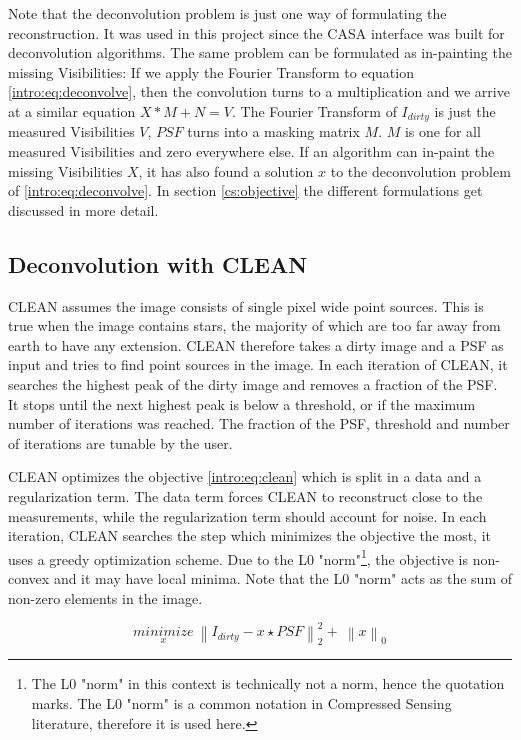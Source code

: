Note that the deconvolution problem is just one way of formulating the reconstruction. It was used in this project since the CASA interface was built for deconvolution algorithms. The same problem can be formulated as in-painting the missing Visibilities: If we apply the Fourier Transform to equation \eqref{intro:eq:deconvolve}, then the convolution turns to a multiplication and we arrive at a similar equation $X*M + N = V$. The Fourier Transform of $I_{dirty}$ is just the measured Visibilities $V$,  $PSF$ turns into a masking matrix $M$. $M$ is one for all measured Visibilities and zero everywhere else. If an algorithm can in-paint the missing Visibilities $X$, it has also found a solution $x$ to the deconvolution problem of \eqref{intro:eq:deconvolve}. In section \ref{cs:objective} the different formulations get discussed in more detail.


\subsection{Deconvolution with CLEAN}
CLEAN assumes the image consists of single pixel wide point sources. This is true when the image contains stars, the majority of which are too far away from earth to have any extension. CLEAN therefore takes a dirty image and a PSF as input and tries to find point sources in the image. In each iteration of CLEAN, it searches the highest peak of the dirty image and removes a fraction of the PSF. It stops until the next highest peak is below a threshold, or if the maximum number of iterations was reached. The fraction of the PSF, threshold and number of iterations are tunable by the user. 

CLEAN optimizes the objective \eqref{intro:eq:clean} which is split in a data and a regularization term. The data term forces CLEAN to reconstruct close to the measurements, while the regularization term should account for noise. In each iteration, CLEAN searches the step which minimizes the objective the most, it uses a greedy optimization scheme. Due to the L0 "norm"\footnote{The L0 "norm" in this context is technically not a norm, hence the quotation marks. The L0 "norm" is a common notation in Compressed Sensing literature, therefore it is used here.}, the objective is non-convex and it may have local minima. Note that the L0 "norm" acts as the sum of non-zero elements in the image.

\begin{equation}\label{intro:eq:clean}
\underset{x}{minimize} \: \left \| I_{dirty} - x \star PSF \right \|_2^2 + \: \left \| x \right \|_0
\end{equation}

